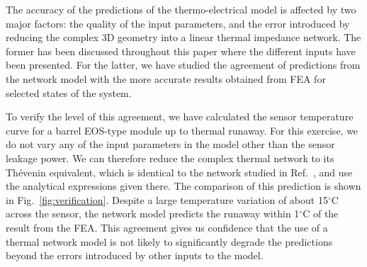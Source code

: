 The accuracy of the predictions of the thermo-electrical model is affected by two major factors: the quality of the input parameters, and the error introduced by reducing the complex 3D geometry into a linear thermal impedance network. The former has been discussed throughout this paper where the different inputs have been presented. For the latter, we have studied the agreement of predictions from the network model with the more accurate results obtained from FEA for selected states of the system.

To verify the level of this agreement, we have calculated the sensor temperature curve for a barrel EOS-type module up to thermal runaway. For this exercise, we do not vary any of the input parameters in the model other than the sensor leakage power. We can therefore reduce the complex thermal network to its Th\'{e}venin equivalent, which is identical to the network studied in Ref.~\cite{Beck:2010zzd}, and use the analytical expressions given there. The comparison of this prediction is shown in Fig.~\ref{fig:verification}. Despite a large temperature variation of about 15$^\circ$C across the sensor, 
the network model predicts the runaway within 1$^\circ$C of the result from the FEA. This agreement gives us confidence that the use of a thermal network model is not likely to significantly degrade the predictions beyond the errors introduced by other inputs to the model. 


